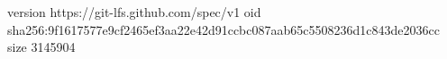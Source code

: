version https://git-lfs.github.com/spec/v1
oid sha256:9f1617577e9cf2465ef3aa22e42d91ccbc087aab65c5508236d1c843de2036cc
size 3145904
